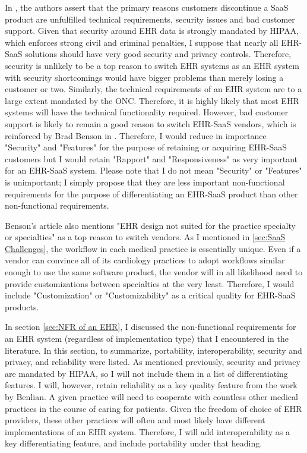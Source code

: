 \documentclass[10pt]{article}
\begin{document}
In \cite{saasqual}, the authors assert that the primary reasons customers discontinue a SaaS product are unfulfilled technical requirements, security issues and bad customer support.
Given that security around EHR data is strongly mandated by HIPAA, which enforces strong civil and criminal penalties, I suppose that nearly all EHR-SaaS solutions should have very good security and privacy controls.
Therefore, security is unlikely to be a top reason to switch EHR systems as an EHR system with security shortcomings would have bigger problems than merely losing a customer or two.
Similarly, the technical requirements of an EHR system are to a large extent mandated by the ONC.
Therefore, it is highly likely that most EHR systems will have the technical functionality required.
However, bad customer support is likely to remain a good reason to switch EHR-SaaS vendors, which is reinforced by Brad Benson in \cite{switch-ehr}.
Therefore, I would reduce in importance "Security" and "Features" for the purpose of retaining or acquiring EHR-SaaS customers but I would retain "Rapport" and "Responsiveness" as very important for an EHR-SaaS system.
Please note that I do not mean "Security" or "Features" is unimportant; 
I simply propose that they are less important non-functional requirements for the purpose of differentiating an EHR-SaaS product than other non-functional requirements.

Benson's article also mentions "EHR design not suited for the practice specialty or specialties" as a top reason to switch vendors.
As I mentioned in \ref{sec:SaaS Challenges}, the workflow in each medical practice is essentially unique.
Even if a vendor can convince all of its cardiology practices to adopt workflows similar enough to use the same software product, the vendor will in all likelihood need to provide customizations between specialties at the very least.
Therefore, I would include "Customization" or "Customizability" as a critical quality for EHR-SaaS products.

In section \ref{sec:NFR of an EHR}, I discussed the non-functional requirements for an EHR system (regardless of implementation type) that I encountered in the literature.
In this section, to summarize, portability, interoperability, security and privacy, and reliability were listed.
As mentioned previously, security and privacy are mandated by HIPAA, so I will not include them in a list of differentiating features.
I will, however, retain reliability as a key quality feature from the work by Benlian.
A given practice will need to cooperate with countless other medical practices in the course of caring for patients.
Given the freedom of choice of EHR providers, these other practices will often and most likely have different implementations of an EHR system.
Therefore, I will add interoperability as a key differentiating feature, and include portability under that heading.
\end{document}
